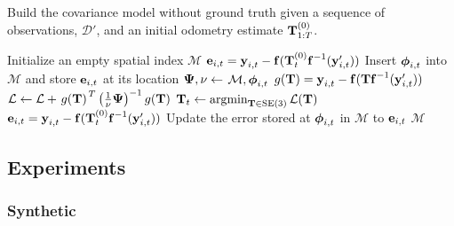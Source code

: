 \begin{algorithm}
  \caption{Build the covariance model without ground truth given a sequence of observations, $\mathcal{D'}$, and an initial odometry estimate $\boldsymbol{\mathbf{T}}_{1:T}^{(0)}$.}
  \label{alg:train-em}
  \begin{algorithmic}
      \State Initialize an empty spatial index $\mathcal{M}$
          \State $\boldsymbol{\mathbf{e}}_{i,t} = \boldsymbol{\mathbf{y}}_{i, t} -
          \boldsymbol{\mathbf{f}}( \boldsymbol{\mathbf{T}}_t^{(0)} \boldsymbol{\mathbf{f}}^{-1}(
            \boldsymbol{\mathbf{y}}_{i, t}' ))$
            \State Insert $\boldsymbol{\mathbf{\phi}}_{i,t}$ into $\mathcal{M}$ and store
              $\boldsymbol{\mathbf{e}}_{i,t}$ at its location
        \EndFor
      \EndFor
      \Repeat
            \State $\boldsymbol{\mathbf{\Psi}}, \nu\gets$  {$\mathcal{M}, \boldsymbol{\mathbf{\phi}}_{i,t}$}
            \State $g(\boldsymbol{\mathbf{T}}) = \boldsymbol{\mathbf{y}}_{i, t} -
              \boldsymbol{\mathbf{f}}( \boldsymbol{\mathbf{T}}\boldsymbol{\mathbf{f}}^{-1}(
              \boldsymbol{\mathbf{y}}_{i, t}' ))$
            \State $\mathcal{L} \gets \mathcal{L} +
              \left.{g(\boldsymbol{\mathbf{T}})}\right.^T
              \left(\frac{1}{\nu}\boldsymbol{\mathbf{\Psi}}\right)^{-1}
              g(\boldsymbol{\mathbf{T}})$
          \EndFor
          \State $\boldsymbol{\mathbf{T}}_t \gets \operatorname*{argmin}_{\boldsymbol{\mathbf{T}}\in\text{SE}(3)}
            \mathcal{L}(\boldsymbol{\mathbf{T}})$
          \State $\boldsymbol{\mathbf{e}}_{i,t} = \boldsymbol{\mathbf{y}}_{i, t} -
            \boldsymbol{\mathbf{f}}( \boldsymbol{\mathbf{T}}_t^{(0)} \boldsymbol{\mathbf{f}}^{-1}(
            \boldsymbol{\mathbf{y}}_{i, t}' ))$
          \State Update the error stored at $\boldsymbol{\mathbf{\phi}}_{i,t}$ in $\mathcal{M}$
            to $\boldsymbol{\mathbf{e}}_{i,t}$
        \EndFor
      \State\Return $\mathcal{M}$
    \EndFunction
  \end{algorithmic}
\end{algorithm}

\subsection{Experiments}
\subsubsection{Synthetic}

